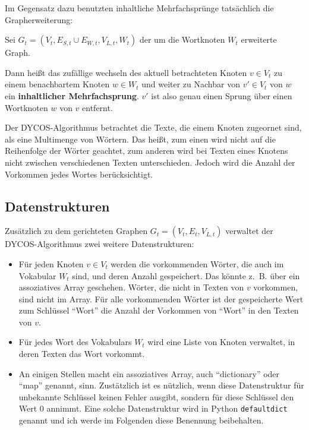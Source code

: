 Im Gegensatz dazu benutzten inhaltliche Mehrfachsprünge
tatsächlich die Grapherweiterung:

\begin{definition}
    Sei $G_t = (V_t, E_{S,t} \cup E_{W,t}, V_{L,t}, W_{t})$ der
    um die Wortknoten $W_{t}$ erweiterte Graph.

    Dann heißt das zufällige wechseln des aktuell betrachteten
    Knoten $v \in V_t$ zu einem benachbartem Knoten $w \in W_t$
    und weiter zu Nachbar von $v' \in V_t$ von $w$
    ein \textbf{inhaltlicher Mehrfachsprung}. $v'$ ist also genau
    einen Sprung über einen Wortknoten $w$ von $v$ entfernt.
\end{definition}

Der DYCOS-Algorithmus betrachtet die Texte, die einem Knoten 
zugeornet sind, als eine
Multimenge von Wörtern. Das heißt, zum einen wird nicht auf die
Reihenfolge der Wörter geachtet, zum anderen wird bei Texten
eines Knotens nicht zwischen verschiedenen Texten unterschieden.
Jedoch wird die Anzahl der Vorkommen jedes Wortes berücksichtigt.

\subsection{Datenstrukturen}
Zusätzlich zu dem gerichteten Graphen $G_t = (V_t, E_t, V_{L,t})$ 
verwaltet der DYCOS-Algorithmus zwei weitere Datenstrukturen:
\begin{itemize}
    \item Für jeden Knoten $v \in V_t$ werden die vorkommenden Wörter,
          die auch im Vokabular $W_t$ sind,
          und deren Anzahl gespeichert. Das könnte z.~B. über ein 
          assoziatives Array geschehen. Wörter, die nicht in 
          Texten von $v$ vorkommen, sind nicht im Array. Für
          alle vorkommenden Wörter ist der gespeicherte Wert zum 
          Schlüssel \enquote{Wort} die Anzahl der Vorkommen von 
          \enquote{Wort} in den Texten von $v$.
    \item Für jedes Wort des Vokabulars $W_t$ wird eine Liste von 
          Knoten verwaltet, in deren Texten das Wort vorkommt.
    \item An einigen Stellen macht ein assoziatives Array, auch 
          \enquote{dictionary} oder \enquote{map} genannt, sinn.
          Zustätzlich ist es nützlich, wenn diese Datenstruktur für 
          unbekannte Schlüssel keinen Fehler ausgibt, sondern für diese
          Schlüssel den Wert 0 annimmt. Eine solche Datenstruktur
          wird in Python \texttt{defaultdict} genannt und ich werde
          im Folgenden diese Benennung beibehalten.
\end{itemize}

